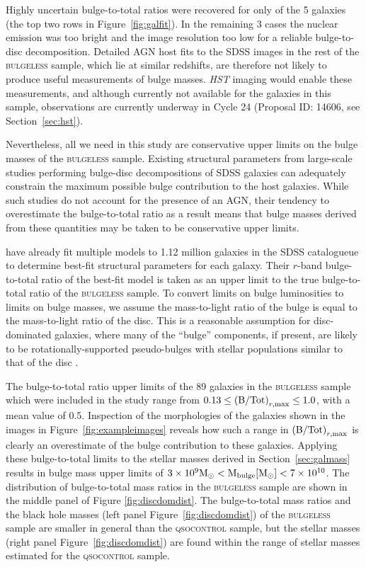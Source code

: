 {Highly uncertain bulge-to-total ratios were recovered for only {} of the 5 galaxies (the top two rows in Figure~\ref{fig:galfit}). In the remaining 3 cases the nuclear emission was too bright and the image resolution too low for a reliable bulge-to-disc decomposition.  Detailed AGN host fits to the SDSS images in the rest of the \textsc{bulgeless} sample, which lie at similar redshifts, are therefore not likely to produce useful measurements of bulge masses. \emph{HST} imaging would enable these measurements, and although currently not available for the galaxies in this sample, observations are currently underway in Cycle 24 (Proposal ID: 14606, see Section~\ref{sec:hst}). 

Nevertheless, all we need in this study are conservative upper limits on the bulge masses of the \textsc{bulgeless} sample. Existing structural parameters from large-scale studies performing bulge-disc decompositions of SDSS galaxies can adequately constrain the maximum possible bulge contribution to the host galaxies. While such studies do not account for the presence of an AGN, their tendency to overestimate the bulge-to-total ratio as a result means that bulge masses derived from these quantities may be taken to be conservative upper limits.

\citet{simard11} have already fit multiple models to 1.12 million galaxies in the SDSS catalogueue to determine best-fit structural parameters for each galaxy. Their $r$-band bulge-to-total ratio {\notebsm of the best-fit model} is taken as an upper limit to the true bulge-to-total ratio of the \textsc{bulgeless} sample. To convert limits on bulge luminosities to limits on bulge masses, we assume the mass-to-light ratio of the bulge is equal to the mass-to-light ratio of the disc. This is a reasonable assumption for disc-dominated galaxies, where many of the ``bulge'' components, if present, are likely to be rotationally-supported pseudo-bulges \citep{kormendy04} with stellar populations similar to that of the disc {\notebsm \citep{graham01a}}.

The bulge-to-total ratio upper limits of the 89 galaxies in the \textsc{bulgeless} sample which were included in the \citet{simard11} study range from {\notebsm $0.13 \leq \left({\rm B/Tot}\right)_{r, \rm max} \leq 1.0$, with a mean value of 0.5}. Inspection of the morphologies of the galaxies shown in the images in Figure~\ref{fig:exampleimages} reveals how such a range in $\left({\rm B/Tot}\right)_{r, \rm max}$ is clearly an overestimate of the bulge contribution to these galaxies. Applying these bulge-to-total limits to the stellar masses derived in Section~\ref{sec:galmass} results in bulge mass upper limits of {\notebsm $3 \times 10^9 \rm{M}_{\odot} < \rm M_{\rm{bulge}}[\rm{M}_{\odot}] < 7 \times 10^{10} $}. The distribution of bulge-to-total mass ratios in the \textsc{bulgeless} sample are shown in the middle panel of Figure \ref{fig:discdomdist}. The bulge-to-total mass ratios and the black hole masses (left panel Figure~\ref{fig:discdomdist}) of the \textsc{bulgeless} sample are smaller in general than the \textsc{qsocontrol} sample, but the stellar masses (right panel Figure~\ref{fig:discdomdist}) are found within the range of stellar masses estimated for the \textsc{qsocontrol} sample. 

}
